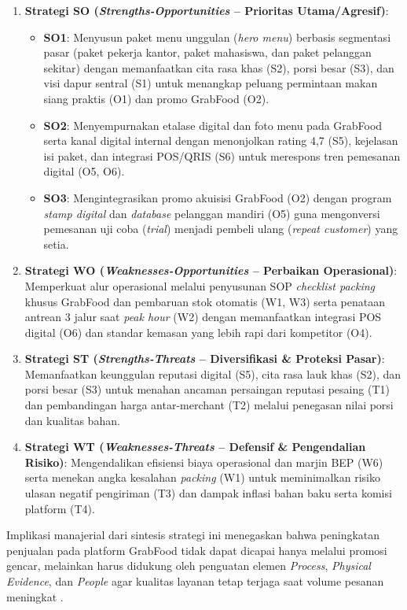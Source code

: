 \begin{enumerate}
    \begin{enumerate}[label=\alph*.]
        \item \textbf{Strategi SO (\textit{Strengths-Opportunities} -- Prioritas Utama/Agresif)}:
        \begin{itemize}
            \item \textbf{SO1}: Menyusun paket menu unggulan (\textit{hero menu}) berbasis segmentasi pasar (paket pekerja kantor, paket mahasiswa, dan paket pelanggan sekitar) dengan memanfaatkan cita rasa khas (S2), porsi besar (S3), dan visi dapur sentral (S1) untuk menangkap peluang permintaan makan siang praktis (O1) dan promo GrabFood (O2).
            \item \textbf{SO2}: Menyempurnakan etalase digital dan foto menu pada GrabFood serta kanal digital internal dengan menonjolkan rating 4,7 (S5), kejelasan isi paket, dan integrasi POS/QRIS (S6) untuk merespons tren pemesanan digital (O5, O6).
            \item \textbf{SO3}: Mengintegrasikan promo akuisisi GrabFood (O2) dengan program \textit{stamp digital} dan \textit{database} pelanggan mandiri (O5) guna mengonversi pemesanan uji coba (\textit{trial}) menjadi pembeli ulang (\textit{repeat customer}) yang setia.
        \end{itemize}
        
        \item \textbf{Strategi WO (\textit{Weaknesses-Opportunities} -- Perbaikan Operasional)}:
        Memperkuat alur operasional melalui penyusunan SOP \textit{checklist packing} khusus GrabFood dan pembaruan stok otomatis (W1, W3) serta penataan antrean 3 jalur saat \textit{peak hour} (W2) dengan memanfaatkan integrasi POS digital (O6) dan standar kemasan yang lebih rapi dari kompetitor (O4).
        
        \item \textbf{Strategi ST (\textit{Strengths-Threats} -- Diversifikasi \& Proteksi Pasar)}:
        Memanfaatkan keunggulan reputasi digital (S5), cita rasa lauk khas (S2), dan porsi besar (S3) untuk menahan ancaman persaingan reputasi pesaing (T1) dan pembandingan harga antar-merchant (T2) melalui penegasan nilai porsi dan kualitas bahan.
        
        \item \textbf{Strategi WT (\textit{Weaknesses-Threats} -- Defensif \& Pengendalian Risiko)}:
        Mengendalikan efisiensi biaya operasional dan marjin BEP (W6) serta menekan angka kesalahan \textit{packing} (W1) untuk meminimalkan risiko ulasan negatif pengiriman (T3) dan dampak inflasi bahan baku serta komisi platform (T4).
    \end{enumerate}
    
    Implikasi manajerial dari sintesis strategi ini menegaskan bahwa peningkatan penjualan pada platform GrabFood tidak dapat dicapai hanya melalui promosi gencar, melainkan harus didukung oleh penguatan elemen \textit{Process}, \textit{Physical Evidence}, dan \textit{People} agar kualitas layanan tetap terjaga saat volume pesanan meningkat \parencite{wirtz2024servicesmarketing,chaffey2022digitalmarketing,kotler2023principlesmarketing}.
\end{enumerate}

